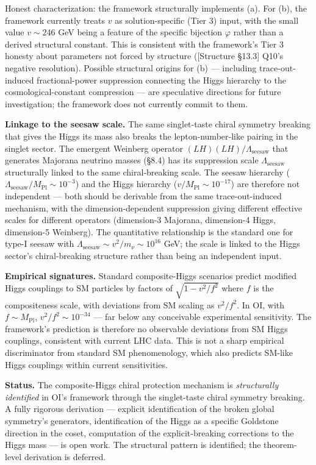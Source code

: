 \documentclass[
]{article}
\begin{document}
Honest characterization: the framework structurally implements (a). For
(b), the framework currently treats \(v\) as solution-specific (Tier 3)
input, with the small value \(v \sim 246\) GeV being a feature of the
specific bijection \(\varphi\) rather than a derived structural
constant. This is consistent with the framework's Tier 3 honesty about
parameters not forced by structure ({[}Structure §13.3{]} Q10's negative
resolution). Possible structural origins for (b) --- including
trace-out-induced fractional-power suppression connecting the Higgs
hierarchy to the cosmological-constant compression --- are speculative
directions for future investigation; the framework does not currently
commit to them.

\textbf{Linkage to the seesaw scale.} The same singlet-taste chiral
symmetry breaking that gives the Higgs its mass also breaks the
lepton-number-like pairing in the singlet sector. The emergent Weinberg
operator \((LH)(LH)/\Lambda_{\mathrm{seesaw}}\) that generates Majorana
neutrino masses (§8.4) has its suppression scale
\(\Lambda_{\mathrm{seesaw}}\) structurally linked to the same
chiral-breaking scale. The seesaw hierarchy
(\(\Lambda_{\mathrm{seesaw}}/M_{\mathrm{Pl}} \sim 10^{-3}\)) and the
Higgs hierarchy (\(v/M_{\mathrm{Pl}} \sim 10^{-17}\)) are therefore not
independent --- both should be derivable from the same trace-out-induced
mechanism, with the dimension-dependent suppression giving different
effective scales for different operators (dimension-3 Majorana,
dimension-4 Higgs, dimension-5 Weinberg). The quantitative relationship
is the standard one for type-I seesaw with
\(\Lambda_{\mathrm{seesaw}} \sim v^2/m_\nu \sim 10^{16}\) GeV; the scale
is linked to the Higgs sector's chiral-breaking structure rather than
being an independent input.

\textbf{Empirical signatures.} Standard composite-Higgs scenarios
predict modified Higgs couplings to SM particles by factors of
\(\sqrt{1 - v^2/f^2}\) where \(f\) is the compositeness scale, with
deviations from SM scaling as \(v^2/f^2\). In OI, with
\(f \sim M_{\mathrm{Pl}}\), \(v^2/f^2 \sim 10^{-34}\) --- far below any
conceivable experimental sensitivity. The framework's prediction is
therefore no observable deviations from SM Higgs couplings, consistent
with current LHC data. This is not a sharp empirical discriminator from
standard SM phenomenology, which also predicts SM-like Higgs couplings
within current sensitivities.

\textbf{Status.} The composite-Higgs chiral protection mechanism is
\emph{structurally identified} in OI's framework through the
singlet-taste chiral symmetry breaking. A fully rigorous derivation ---
explicit identification of the broken global symmetry's generators,
identification of the Higgs as a specific Goldstone direction in the
coset, computation of the explicit-breaking corrections to the Higgs
mass --- is open work. The structural pattern is identified; the
theorem-level derivation is deferred.
\end{document}
